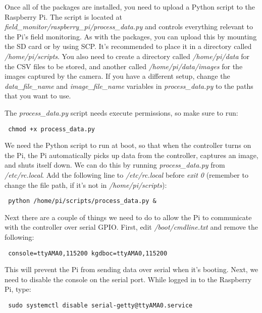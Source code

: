 \documentclass[10pt]{article}
\begin{document}
Once all of the packages are installed, you need to upload a Python script to the Raspberry Pi. The script is located at
\textit{field\_monitor/raspberry\_pi/process\_data.py} and controls everything relevant to the Pi's field monitoring. As with the packages, you can upload this by
mounting the SD card or by using SCP. It's recommended to place it in a directory called \textit{/home/pi/scripts}. You also need to create a directory called
\textit{/home/pi/data} for the CSV files to be stored, and another called \textit{/home/pi/data/images} for the images captured by the camera. If you have a different
setup, change the \textit{data\_file\_name} and \textit{image\_file\_name} variables in \textit{process\_data.py} to the paths that you want to use.

The \textit{process\_data.py} script needs execute permissions, so make sure to run:

\begin{verbatim}
 chmod +x process_data.py
\end{verbatim}

We need the Python script to run at boot, so that when the controller turns on the Pi, the Pi automatically picks up data from the controller, captures an
image, and shuts itself down. We can do this by running \textit{process\_data.py} from \textit{/etc/rc.local}. Add the following line to \textit{/etc/rc.local} before
\textit{exit 0} (remember to change the file path, if it's not in \textit{/home/pi/scripts}):

\begin{verbatim}
 python /home/pi/scripts/process_data.py &
\end{verbatim}

Next there are a couple of things we need to do to allow the Pi to communicate with the controller over serial GPIO. First, edit \textit{/boot/cmdline.txt} and remove
the following:

\begin{verbatim}
 console=ttyAMA0,115200 kgdboc=ttyAMA0,115200
\end{verbatim}

This will prevent the Pi from sending data over serial when it's booting. Next, we need to disable the console on the serial port. While logged in to the Raspberry Pi,
type:

\begin{verbatim}
 sudo systemctl disable serial-getty@ttyAMA0.service
\end{verbatim}
\end{document}
